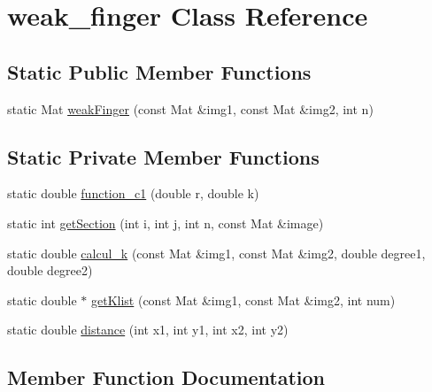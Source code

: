 \hypertarget{classweak__finger}{}\section{weak\+\_\+finger Class Reference}
\label{classweak__finger}
\subsection*{Static Public Member Functions}
\begin{DoxyCompactItemize}
\item 
static Mat \hyperlink{classweak__finger_ad3ecfc2d0a1e50984962e38e3ed65d2d}{weak\+Finger} (const Mat \&img1, const Mat \&img2, int n)
\end{DoxyCompactItemize}
\subsection*{Static Private Member Functions}
\begin{DoxyCompactItemize}
\item 
static double \hyperlink{classweak__finger_a7f52398fece111f0aefc46c1780faf0b}{function\+\_\+c1} (double r, double k)
\item 
static int \hyperlink{classweak__finger_ac5ca2f3040830e3fbf24a10bd85fbb55}{get\+Section} (int i, int j, int n, const Mat \&image)
\item 
static double \hyperlink{classweak__finger_acfa0a4cbe7e887aa30125f435ad7589b}{calcul\+\_\+k} (const Mat \&img1, const Mat \&img2, double degree1, double degree2)
\item 
static double $\ast$ \hyperlink{classweak__finger_a8142fad0eac385809328de534dc067ac}{get\+Klist} (const Mat \&img1, const Mat \&img2, int num)
\item 
static double \hyperlink{classweak__finger_ae121304f5306a04b1e0a40f3a678785c}{distance} (int x1, int y1, int x2, int y2)
\end{DoxyCompactItemize}


\subsection{Member Function Documentation}

